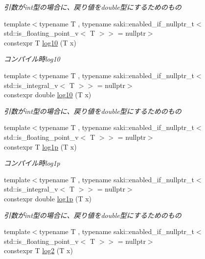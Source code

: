 \begin{DoxyCompactItemize}
\begin{DoxyCompactList}\small\item\em 引数がint型の場合に、戻り値をdouble型にするためのもの \end{DoxyCompactList}\item 
{\footnotesize template$<$typename T , typename saki\+::enabled\+\_\+if\+\_\+nullptr\+\_\+t$<$ std\+::is\+\_\+floating\+\_\+point\+\_\+v$<$ T $>$$>$  = nullptr$>$ }\\constexpr T \mbox{\hyperlink{namespacesaki_aa1a5f3dfe15009e9e985b8b0647211e6}{log10}} (T x)
\begin{DoxyCompactList}\small\item\em コンパイル時log10 \end{DoxyCompactList}\item 
{\footnotesize template$<$typename T , typename saki\+::enabled\+\_\+if\+\_\+nullptr\+\_\+t$<$ std\+::is\+\_\+integral\+\_\+v$<$ T $>$$>$  = nullptr$>$ }\\constexpr double \mbox{\hyperlink{namespacesaki_a7e5fde452567de6eaae1d5c481497757}{log10}} (T x)
\begin{DoxyCompactList}\small\item\em 引数がint型の場合に、戻り値をdouble型にするためのもの \end{DoxyCompactList}\item 
{\footnotesize template$<$typename T , typename saki\+::enabled\+\_\+if\+\_\+nullptr\+\_\+t$<$ std\+::is\+\_\+floating\+\_\+point\+\_\+v$<$ T $>$$>$  = nullptr$>$ }\\constexpr T \mbox{\hyperlink{namespacesaki_ae0b2550b674acc69fa1fbe407917fdc7}{log1p}} (T x)
\begin{DoxyCompactList}\small\item\em コンパイル時log1p \end{DoxyCompactList}\item 
{\footnotesize template$<$typename T , typename saki\+::enabled\+\_\+if\+\_\+nullptr\+\_\+t$<$ std\+::is\+\_\+integral\+\_\+v$<$ T $>$$>$  = nullptr$>$ }\\constexpr double \mbox{\hyperlink{namespacesaki_aec755aa143bd9a0d03c5ebb2dc5dd3de}{log1p}} (T x)
\begin{DoxyCompactList}\small\item\em 引数がint型の場合に、戻り値をdouble型にするためのもの \end{DoxyCompactList}\item 
{\footnotesize template$<$typename T , typename saki\+::enabled\+\_\+if\+\_\+nullptr\+\_\+t$<$ std\+::is\+\_\+floating\+\_\+point\+\_\+v$<$ T $>$$>$  = nullptr$>$ }\\constexpr T \mbox{\hyperlink{namespacesaki_ac184cde6c3531e01531219e081e25452}{log2}} (T x)

\end{DoxyCompactItemize}
